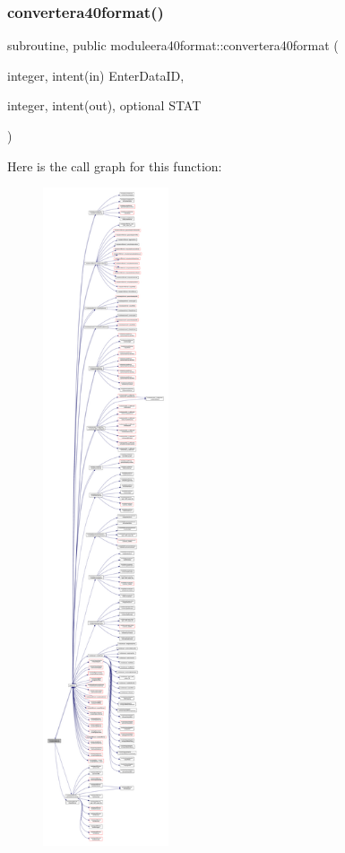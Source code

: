 \subsubsection{\texorpdfstring{convertera40format()}{convertera40format()}}
{\footnotesize\ttfamily subroutine, public moduleera40format\+::convertera40format (\begin{DoxyParamCaption}\item[{integer, intent(in)}]{Enter\+Data\+ID,  }\item[{integer, intent(out), optional}]{S\+T\+AT }\end{DoxyParamCaption})}

Here is the call graph for this function\+:\nopagebreak
\begin{figure}[H]
\begin{center}
\leavevmode
\includegraphics[height=550pt]{namespacemoduleera40format_a0ebf94dc06f2741d57181016580896b9_cgraph}
\end{center}
\end{figure}
